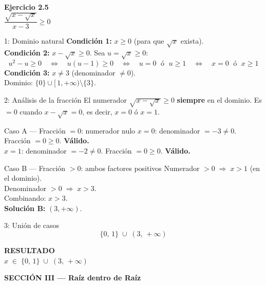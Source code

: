 \documentclass[letterpaper, 11pt]{article}
\newcommand{\exheader}[2]{%
    \begin{tcolorbox}[colback=azulFuerte!12, colframe=azulFuerte,
        arc=8pt, boxrule=1.5pt, enhanced]
        {\large\textbf{\color{azulFuerte}Ejercicio #1}} \\[0.4em]
        \centering\LARGE $\displaystyle #2$
    \end{tcolorbox}
    \smallskip}
\newcommand{\resultado}[1]{%
    \begin{tcolorbox}[colback=azulFuerte, colframe=azulFuerte, colupper=white,
        arc=8pt, boxrule=1.5pt, enhanced, drop shadow={black!12}]
        \centering\large\textbf{RESULTADO} \\[0.4em]
        \LARGE $\displaystyle #1$
    \end{tcolorbox}}
\newcommand{\secheader}[1]{%
    \begin{center}
        \begin{tcolorbox}[colback=azulFuerte, colframe=azulFuerte,
            colupper=white, width=\textwidth, arc=8pt]
            \centering\Large\textbf{#1}
        \end{tcolorbox}
    \end{center}
    \bigskip}
\begin{document}
\clearpage

\exheader{2.5}{\dfrac{\sqrt{x - \sqrt{x}}}{x - 3} \geq 0}

\begin{paso}{1: Dominio natural}
\textbf{Condición 1:} $x \geq 0$ (para que $\sqrt{x}$ exista).\\[0.3em]
\textbf{Condición 2:} $x - \sqrt{x} \geq 0$. Sea $u = \sqrt{x} \geq 0$:
\[
    u^2 - u \geq 0
    \quad\Longleftrightarrow\quad
    u(u-1) \geq 0
    \quad\Longleftrightarrow\quad
    u = 0 \;\text{ ó }\; u \geq 1
    \quad\Longleftrightarrow\quad
    x = 0 \;\text{ ó }\; x \geq 1
\]
\textbf{Condición 3:} $x \neq 3$ (denominador $\neq 0$).\\[0.3em]
Dominio: $\{0\} \cup [\,1,+\infty) \setminus \{3\}$.
\end{paso}

\begin{paso}{2: Análisis de la fracción}
El numerador $\sqrt{x-\sqrt{x}} \geq 0$ \textbf{siempre} en el dominio.
Es $= 0$ cuando $x - \sqrt{x} = 0$, es decir, $x = 0$ ó $x = 1$.

\begin{caso}{Caso A --- Fracción $= 0$: numerador nulo}
$x = 0$: denominador $= -3 \neq 0$. Fracción $= 0 \geq 0$. \textbf{Válido.}\\
$x = 1$: denominador $= -2 \neq 0$. Fracción $= 0 \geq 0$. \textbf{Válido.}
\end{caso}

\bigskip

\begin{caso}{Caso B --- Fracción $> 0$: ambos factores positivos}
Numerador $> 0 \;\Rightarrow\; x > 1$ (en el dominio).\\
Denominador $> 0 \;\Rightarrow\; x > 3$.\\
Combinando: $x > 3$.\\[0.2em]
\textbf{Solución B:} $(3,+\infty)$.
\end{caso}

\end{paso}

\begin{paso}{3: Unión de casos}
\[
    \{0,\,1\} \;\cup\; (3,\,+\infty)
\]
\end{paso}

\resultado{x \;\in\; \{0,\,1\}\;\cup\;(3,\,+\infty)}

\clearpage

\secheader{SECCIÓN III --- Raíz dentro de Raíz}
\end{document}
